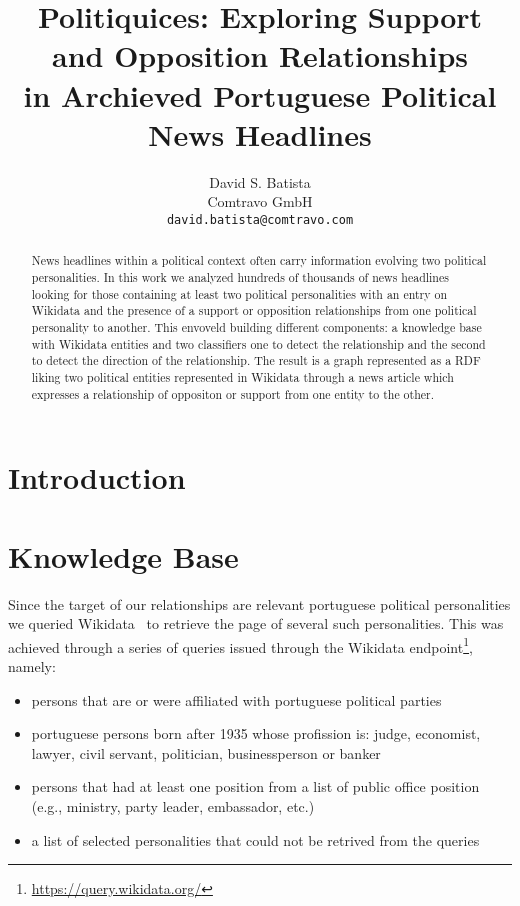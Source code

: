 \documentclass[11pt,a4paper]{article}
\title{Politiquices: Exploring Support and Opposition Relationships \\in Archieved Portuguese Political News Headlines}
\author{David S. Batista \\
  Comtravo GmbH \\
  \texttt{david.batista@comtravo.com}
}
\date{}
\begin{document}
\maketitle
\begin{abstract}
News headlines within a political context often carry information evolving two political personalities.
In this work we analyzed hundreds of thousands of news headlines looking for those containing at least 
two political personalities with an entry on Wikidata and the presence of a support or opposition relationships 
from one political personality to another. This envoveld building different components: a knowledge base with
Wikidata entities and two classifiers one to detect the relationship and the second to detect the direction of
the relationship. The result is a graph represented as a RDF liking two political entities represented in Wikidata
through a news article which expresses a relationship of oppositon or support from one entity to the other.
\end{abstract}


\section{Introduction}
\label{sec:intro}





\section{Knowledge Base}
\label{sec_kb}

Since the target of our relationships are relevant portuguese political personalities we queried
Wikidata~\cite{MKGGB2018} to retrieve the page of several such personalities. This was achieved through a series
of queries issued through the Wikidata endpoint\footnote{\url{https://query.wikidata.org/}}, namely:

\begin{itemize}  
\item persons that are or were affiliated with portuguese political parties
\item portuguese persons born after 1935 whose profission is: judge, economist, lawyer, civil servant, politician, businessperson or banker
\item persons that had at least one position from a list of public office position (e.g., ministry, party leader, embassador, etc.)
\item a list of selected personalities that could not be retrived from the queries
\end{itemize}  
\end{document}
